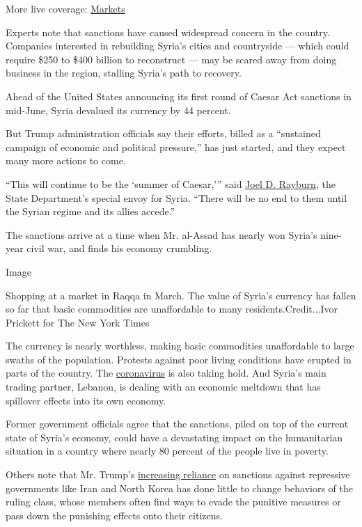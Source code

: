 More live coverage:
\href{https://www.nytimes.com/live/2020/08/04/business/stock-market-today-coronavirus?action=click\&pgtype=Article\&state=default\&region=MAIN_CONTENT_1\&context=storylines_live_updates}{Markets}

Experts note that sanctions have caused widespread concern in the
country. Companies interested in rebuilding Syria's cities and
countryside --- which could require \$250 to \$400 billion to
reconstruct --- may be scared away from doing business in the region,
stalling Syria's path to recovery.

Ahead of the United States announcing its first round of Caesar Act
sanctions in mid-June, Syria devalued its currency by 44 percent.

But Trump administration officials say their efforts, billed as a
``sustained campaign of economic and political pressure,'' has just
started, and they expect many more actions to come.

``This will continue to be the `summer of Caesar,''' said
\href{https://www.state.gov/biographies/joel-d-rayburn/}{Joel D.
Rayburn}, the State Department's special envoy for Syria. ``There will
be no end to them until the Syrian regime and its allies accede.''

The sanctions arrive at a time when Mr. al-Assad has nearly won Syria's
nine-year civil war, and finds his economy crumbling.

Image

Shopping at a market in Raqqa in March. The value of Syria's currency
has fallen so far that basic commodities are unaffordable to many
residents.Credit...Ivor Prickett for The New York Times

The currency is nearly worthless, making basic commodities unaffordable
to large swaths of the population. Protests against poor living
conditions have erupted in parts of the country. The
\href{https://www.nytimes.com/interactive/2020/world/coronavirus-maps.html}{coronavirus}
is also taking hold. And Syria's main trading partner, Lebanon, is
dealing with an economic meltdown that has spillover effects into its
own economy.

Former government officials agree that the sanctions, piled on top of
the current state of Syria's economy, could have a devastating impact on
the humanitarian situation in a country where nearly 80 percent of the
people live in poverty.

Others note that Mr. Trump's
\href{https://www.nytimes.com/2019/11/15/us/politics/trump-iran-sanctions.html}{increasing
reliance} on sanctions against repressive governments like Iran and
North Korea has done little to change behaviors of the ruling class,
whose members often find ways to evade the punitive measures or pass
down the punishing effects onto their citizens.

